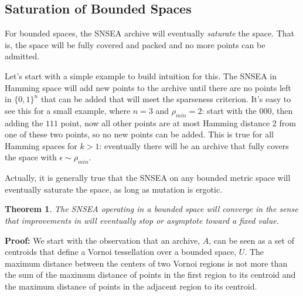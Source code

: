 \documentclass[twoside]{article}
\newtheorem{theorem}{Theorem}
\begin{document}
\subsection{Saturation of Bounded Spaces}
\label{subsec:saturation}
For bounded spaces, the SNSEA archive will eventually \emph{saturate} the space.  That is, the space will be fully covered and packed and no more points can be admitted.  

Let's start with a simple example to build intuition for this.  The  SNSEA in Hamming space will add new points to the archive until there are no points left in $\{0,1\}^n$ that can be added that will meet the sparseness criterion.  It's easy to see this for a small example, where $n=3$ and $\rho_{min} = 2$:  start with the $000$, then adding the $111$ point, now all other points are at most Hamming distance 2 from one of these two points, so no new points can be added.  This is true for all Hamming spaces for $k>1$:  eventually there will be an archive that fully covers the space with $\epsilon \sim \rho_{min}$.

Actually, it is generally true that the SNSEA on any bounded metric space will eventually saturate the space, as long as mutation is ergotic.
\begin{theorem}
The SNSEA operating in a bounded space will converge in the sense that improvements in \emph{} will eventually stop or asymptote toward a fixed value.
\end{theorem}
\textbf{Proof:} We start with the observation that an archive, $A$, can be seen as a set of centroids that define a Vornoi tessellation 
over a bounded space, $U$.  The maximum distance between the centers of two Vornoi regions is not more than the sum of the maximum distance of points in the first region to its centroid and the maximum distance of points in the adjacent region to its centroid.%
\end{document}
